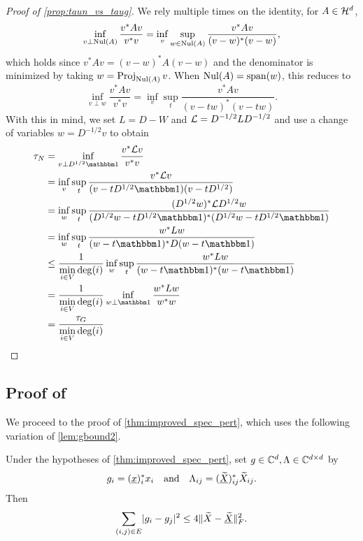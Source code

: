 \begin{proof}[Proof of \cref{prop:taun_vs_taug}]
  We rely multiple times on the identity, for $A \in \mathcal{H}^d$, \[\inf_{v \perp \operatorname{Nul}(A)} \dfrac{v^* A v}{v^* v} = \inf_v \sup_{w \in \operatorname{Nul}(A)} \dfrac{v^* A v}{(v - w)^*(v - w)},\] which holds since $v^* A v = (v - w)^* A (v - w)$ and the denominator is minimized by taking $w = \operatorname{Proj}_{\operatorname{Nul}(A)} v$.  When $\operatorname{Nul}(A) = \operatorname{span}(w)$, this reduces to \[\inf_{v \perp w} \dfrac{v^* A v}{v^* v} = \inf_v \sup_t \dfrac{v^* A v}{(v - t w)^* (v - t w)}.\]  With this in mind, we set $L = D - W$ and $\mathcal{L} = D^{-1/2} L D^{-1/2}$ and use a change of variables $w = D^{-1 / 2} v$ to obtain
  \begin{align*}
    \tau_N &= \inf_{v \perp D^{1 / 2} \one} \dfrac{v^* \Lc v}{v^* v} \\
    &= \inf_v \sup_t \dfrac{v^* \Lc v}{(v - t D^{1 / 2} \one)(v - t D^{1 /2})} \\
    &= \inf_w \sup_t \dfrac{(D^{1 / 2} w)^* \Lc D^{1 / 2} w}{(D^{1 / 2} w - t D^{1 / 2} \one)^* (D^{1 / 2} w - t D^{1 / 2} \one)} \\
    &= \inf_w \sup_t \dfrac{w^* L w}{(w - t \one)^* D (w - t \one)} \\
    &\le \dfrac{1}{\min\limits_{i \in V} \deg(i)} \inf_w \sup_t \dfrac{w^* L w}{(w - t \one)^* (w - t \one)} \\
    &= \dfrac{1}{\min\limits_{i \in V} \deg(i)} \inf_{w \perp \one} \dfrac{w^* L w}{w^* w} \\
    &= \dfrac{\tau_G}{\min\limits_{i \in V} \deg(i)}
  \end{align*}
\end{proof}



\subsection{Proof of }
We proceed to the proof of \cref{thm:improved_spec_pert}, which uses the following variation of \cref{lem:gbound2}.

\begin{lemma}
  Under the hypotheses of \cref{thm:improved_spec_pert}, set $g \in \mathbb{C}^d, \Lambda \in \mathbb{C}^{d \times d}$ by \[g_i = (\underline{x})^*_i x_i \quad \text{and} \quad \Lambda_{ij} = (\underline{\widetilde{X}})^*_{ij} \widetilde{X}_{ij}.\]  Then \[ \sum_{(i, j) \in E} \lvert g_i - g_j\rvert^2 \le 4 \lVert\widetilde{X} - \underline{\widetilde{X}}\rVert_F^2.\]
  \label{lem:gi_improved}
\end{lemma}

